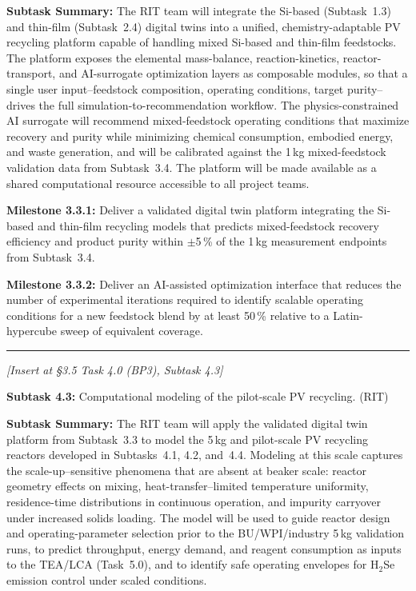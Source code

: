 \documentclass[11pt]{article}
\begin{document}
\noindent\textbf{Subtask Summary:} The RIT team will integrate the
Si-based (Subtask~1.3) and thin-film (Subtask~2.4) digital twins into a
unified, chemistry-adaptable PV recycling platform capable of handling
mixed Si-based and thin-film feedstocks. The platform exposes the
elemental mass-balance, reaction-kinetics, reactor-transport, and
AI-surrogate optimization layers as composable modules, so that a
single user input--feedstock composition, operating conditions, target
purity--drives the full simulation-to-recommendation workflow. The
physics-constrained AI surrogate will recommend mixed-feedstock
operating conditions that maximize recovery and purity while minimizing
chemical consumption, embodied energy, and waste generation, and will
be calibrated against the 1\,kg mixed-feedstock validation data from
Subtask~3.4. The platform will be made available as a shared
computational resource accessible to all project teams.\par

\noindent\textbf{Milestone 3.3.1:} Deliver a validated digital twin
platform integrating the Si-based and thin-film recycling models that
predicts mixed-feedstock recovery efficiency and product purity within
$\pm$5\,\% of the 1\,kg measurement endpoints from Subtask~3.4.\par

\noindent\textbf{Milestone 3.3.2:} Deliver an AI-assisted optimization
interface that reduces the number of experimental iterations required
to identify scalable operating conditions for a new feedstock blend by
at least 50\,\% relative to a Latin-hypercube sweep of equivalent
coverage.

\vspace{1em}\noindent\rule{0.4\textwidth}{0.4pt}\vspace{0.6em}


\noindent\textit{[Insert at \S3.5 Task 4.0 (BP3), Subtask 4.3]}\par

\noindent\textbf{Subtask 4.3:} Computational modeling of the pilot-scale
PV recycling. (RIT)\par

\noindent\textbf{Subtask Summary:} The RIT team will apply the
validated digital twin platform from Subtask~3.3 to model the 5\,kg and
pilot-scale PV recycling reactors developed in Subtasks~4.1, 4.2,
and~4.4. Modeling at this scale captures the scale-up--sensitive
phenomena that are absent at beaker scale: reactor geometry effects on
mixing, heat-transfer--limited temperature uniformity, residence-time
distributions in continuous operation, and impurity carryover under
increased solids loading. The model will be used to guide reactor
design and operating-parameter selection prior to the BU/WPI/industry
5\,kg validation runs, to predict throughput, energy demand, and reagent
consumption as inputs to the TEA/LCA (Task~5.0), and to identify safe
operating envelopes for H$_2$Se emission control under scaled
conditions.\par
\end{document}
